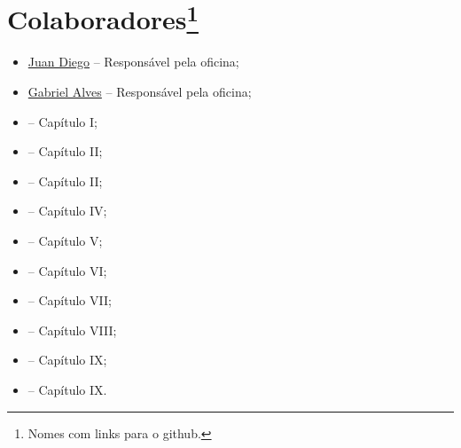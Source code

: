 \chapter*{Colaboradores\footnote{Nomes com links para o github.}}

\begin{itemize}
	\item \href{https://github.com/DJuanDiego}{Juan Diego} -- Responsável pela oficina;
	\item \href{https://github.com/Gabriel-Alves-13}{Gabriel Alves} -- Responsável pela oficina;
	\item -- Capítulo I;
	\item -- Capítulo II;
	\item -- Capítulo II;
	\item -- Capítulo IV;
	\item -- Capítulo V;
	\item -- Capítulo VI;
	\item -- Capítulo VII;
	\item -- Capítulo VIII;
	\item -- Capítulo IX;
	\item -- Capítulo IX.
\end{itemize}

\clearpage
